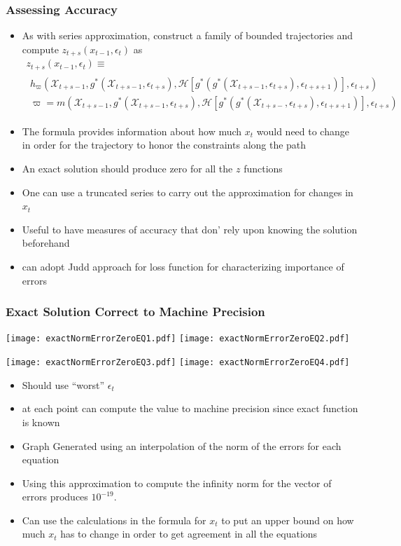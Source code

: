 \documentclass[letter]{beamer}
\begin{document}
\begin{frame}
  \frametitle{Assessing Accuracy}
{\small

  \begin{itemize}
  \item As with series approximation,
 construct a family of bounded trajectories and compute
$  z_{t+s}(x_{t-1},\epsilon_t)$ as  %
{
\begin{gather}
  z_{t+s}(x_{t-1},\epsilon_t) \equiv\\
   \begin{split}
 h_{\varpi}(\mathcal{X}_{t+s-1},g^\ast(\mathcal{X}_{t+s-1},\epsilon_{t+s}),\mathcal{H}[g^\ast(g^\ast(\mathcal{X}_{t+s-1},\epsilon_{t+s}),\epsilon_{t+s+1})],\epsilon_{t+s}) \label{theProblem} \\
\varpi= m(\mathcal{X}_{t+s-1},g^\ast(\mathcal{X}_{t+s-1},\epsilon_{t+s}),\mathcal{H}[g^\ast(g^\ast(\mathcal{X}_{t+s-},\epsilon_{t+s}),\epsilon_{t+s+1})],\epsilon_{t+s}) 
   \end{split}
  \end{gather}
}
\item The formula  provides information about how much $x_{t}$ would need
to change in order for the trajectory to honor the constraints along the path
\item An exact solution should produce zero for all the $z$ functions
\item One can use a truncated series to carry out the approximation for changes in $x_t$
\item Useful to have measures of accuracy that don' rely upon knowing the solution beforehand
\item can adopt Judd approach for loss function for characterizing importance of errors
  \end{itemize}
}
\end{frame}
\begin{frame}
  \frametitle{Exact Solution Correct to Machine Precision}
 \texttt{[image: exactNormErrorZeroEQ1.pdf]}
 \texttt{[image: exactNormErrorZeroEQ2.pdf]}

 \texttt{[image: exactNormErrorZeroEQ3.pdf]}
 \texttt{[image: exactNormErrorZeroEQ4.pdf]}
\end{frame}
\begin{itemize}
\item Should use ``worst'' $\epsilon_t$
\item at each point can compute the value to machine precision since exact function is known
\item Graph Generated using an interpolation of the norm of the errors for each equation
\item Using this approximation to compute the infinity norm for the vector of
errors produces $10^{-19}$.
\item Can use the calculations in the formula for $x_t$ to put an upper bound
on how much $x_t$ has to change in order to get agreement in all the equations
\end{itemize}
\end{document}
